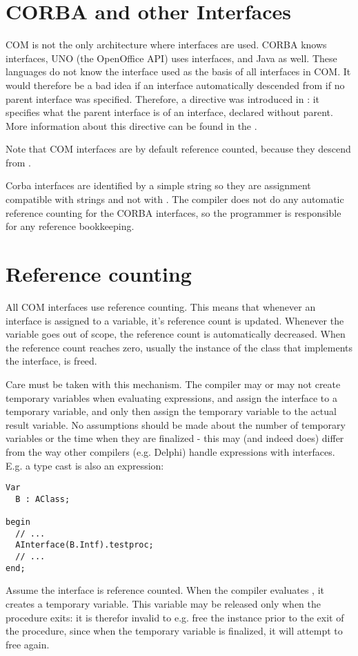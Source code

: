 \section{CORBA and other Interfaces}
COM is not the only architecture where interfaces are used. CORBA knows
interfaces, UNO (the OpenOffice API) uses interfaces, and Java as well.
These languages do not know the  interface used as the basis of
all interfaces in COM. It would therefore be a bad idea if an interface
automatically descended from  if no parent interface was
specified. Therefore, a directive  was introduced in
 \fpc: it specifies what the parent interface is of an interface, declared
without parent. More information about this directive can be found in the
\progref.

Note that COM interfaces are by default reference counted, because they 
descend from .

Corba interfaces are identified by a simple string so they are assignment 
compatible with strings and not with . The compiler does not do 
any automatic reference counting for the CORBA interfaces, so the programmer 
is responsible for any reference bookkeeping.

\section{Reference counting}
All COM interfaces use reference counting.  This means that whenever an
interface is assigned to a variable, it's reference count is updated.
Whenever the variable goes out of scope, the reference count is
automatically decreased. When the reference count reaches zero, usually the
instance of the class that implements the interface, is freed.

Care must be taken with this mechanism. The compiler may or may not create
temporary variables when evaluating expressions, and assign the interface
to a temporary variable, and only then assign the temporary variable to 
the actual result variable. No assumptions should be made about the number
of temporary variables or the time when they are finalized - this may 
(and indeed does) differ from the way other compilers (e.g. Delphi) handle
expressions with interfaces. E.g. a type cast is also an expression:
\begin{verbatim}
Var
  B : AClass;

begin
  // ...
  AInterface(B.Intf).testproc;
  // ...
end;
\end{verbatim}
Assume the interface  is reference counted. When the compiler 
evaluates , it creates a temporary variable. This variable may be 
released only when the procedure exits: it is therefor invalid to e.g. 
free the instance  prior to the exit of the procedure, since when the 
temporary variable is finalized, it will attempt to free  again.

